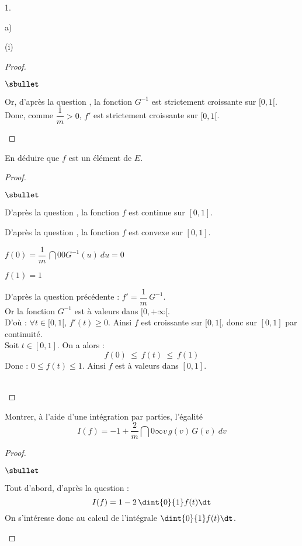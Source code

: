 \documentclass[11pt]{article}%
\begin{document}
\begin{noliste}{1.}
\begin{noliste}{a)}
\begin{nonoliste}{(i)}
\begin{proof}
\begin{noliste}{$\sbullet$}
      \item Or, d'après la question , la fonction $G^{-1}$
      est strictement croissante sur $[0,1[$.\\[.1cm]
      Donc, comme $\dfrac{1}{m} >0$, $f'$ est strictement croissante
      sur $[0,1[$.
      \conc{D'où, d'après la question \itbf{1.b)}, $f$ est 
      convexe sur $[0,1[$.}~\\[-1.2cm]
     \end{noliste}
   \end{proof}
   
   \item En déduire que $f$ est un élément de $E$.
   
   \begin{proof}~
     \begin{noliste}{$\sbullet$}
      \item D'après la question , la fonction $f$ est 
      continue sur $[0,1]$.
      \item D'après la question , la fonction $f$ 
      est convexe sur $[0,1]$.
      \item $f(0)=\dfrac{1}{m} \, \dint{0}{0} G^{-1}(u) \ du =0$
      \item $f(1)=1$
      \item D'après la question précédente : $f'=\dfrac{1}{m} \,
      G^{-1}$.\\[.1cm]
      Or la fonction $G^{-1}$ est à valeurs dans $[0,+\infty[$.\\
      D'où : $\forall t \in [0,1[$, $f'(t) \geq 0$. Ainsi $f$ est 
      croissante sur $[0,1[$, donc sur $[0,1]$ par continuité.\\
      Soit $t\in [0,1]$. On a alors :
      \[
        f(0) \ \leq \ f(t) \ \leq \ f(1)
      \]
      Donc : $0\leq f(t) \leq 1$. Ainsi $f$ est à valeurs dans $[0,1]$.
     \end{noliste}
     ~\\[-1cm]
   \end{proof}
  \end{nonoliste}
  
  \item Montrer, à l'aide d'une intégration par parties, l'égalité
  \[
   I(f)= -1+\dfrac{2}{m} \dint{0}{\infty} v \, g(v) \, G(v) \ dv
  \]
  
  \begin{proof}~
    \begin{noliste}{$\sbullet$}
      \item Tout d'abord, d'après la question  :
      \[
        I(f) = 1-2 \, \dint{0}{1} f(t) \dt
      \]
      On s'intéresse donc au calcul de l'intégrale 
      $\dint{0}{1} f(t) \dt$.


\end{noliste}
\end{proof}
\end{noliste}
\end{noliste}
\end{document}
